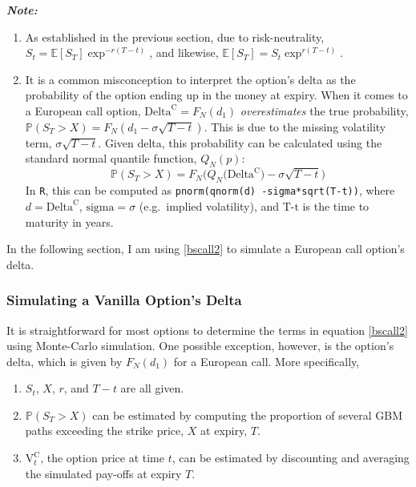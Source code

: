 \documentclass[
  12pt,
]{article}
\providecommand{\tightlist}{%
  \setlength{\itemsep}{0pt}\setlength{\parskip}{0pt}}
\begin{document}
\textbf{\emph{Note:}}

\begin{enumerate}
\def\labelenumi{\arabic{enumi}.}
\tightlist
\item
  As established in the previous section, due to risk-neutrality,
  \(S_t = \mathbb E[S_T] \exp^{-r(T-t)}\), and likewise,
  \(\mathbb E[S_T] = S_t \exp^{r(T-t)}\). \vspace{1mm}
\item
  It is a common misconception to interpret the option's delta as the
  probability of the option ending up in the money at expiry. When it
  comes to a European call option, \(\text{Delta}^{\text{C}}=F_N(d_1)\)
  \emph{overestimates} the true probability,
  \(\mathbb P(S_T>X) = F_N(d_1 - \sigma\sqrt{T-t})\). This is due to the
  missing volatility term, \(\sigma\sqrt{T-t}\). Given delta, this
  probability can be calculated using the standard normal quantile
  function, \(Q_N(p)\):
  \[\mathbb P(S_T>X) = F_N \bigg(Q_N\big(\text{Delta}^{\text{C}}\big) - \sigma\sqrt{T-t} \bigg)\]
  In \texttt{R}, this can be computed as
  \texttt{pnorm(qnorm(d)\ -sigma*sqrt(T-t))}, where
  \(d=\text{Delta}^{\text{C}}\), \(\text{sigma}=\sigma\) (e.g.~implied
  volatility), and \(\text{T-t}\) is the time to maturity in years.
  \vspace{1mm}
\end{enumerate}

In the following section, I am using \eqref{bscall2} to simulate a
European call option's delta.

\newpage

\hypertarget{simulating-a-vanilla-options-delta}{%
\subsubsection{Simulating a Vanilla Option's
Delta}\label{simulating-a-vanilla-options-delta}}

It is straightforward for most options to determine the terms in
equation \eqref{bscall2} using Monte-Carlo simulation. One possible
exception, however, is the option's delta, which is given by
\(F_N(d_1)\) for a European call. More specifically,

\begin{enumerate}
\def\labelenumi{\arabic{enumi}.}
\tightlist
\item
  \(S_t\), \(X\), \(r\), and \(T-t\) are all given.
\item
  \(\mathbb{P}(S_T>X)\) can be estimated by computing the proportion of
  several GBM paths exceeding the strike price, \(X\) at expiry, \(T\).
\item
  \(\text{V}^{\text{C}}_t\), the option price at time \(t\), can be
  estimated by discounting and averaging the simulated pay-offs at
  expiry \(T\).
\end{enumerate}
\end{document}
